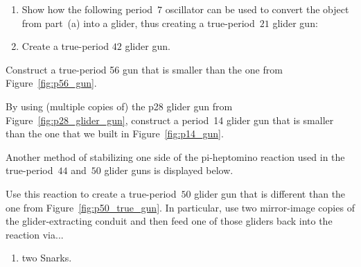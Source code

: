 \begin{multicols}{2}
\begin{problemstar}
\begin{enumerate}[label=\bf\color{ocre}(\alph*)]
			\item {} Show how the following period~$7$ oscillator can be used to convert the object from part~(a) into a glider, thus creating a true-period~$21$ glider gun:
			\begin{center}
			\end{center}
			
			\item {} Create a true-period $42$ glider gun.
		\end{enumerate}
	\end{problemstar}


	\mfilbreak
	
	
	\begin{problem}\label{exer:p56_gun_smaller} 
		Construct a true-period 56 gun that is smaller than the one from Figure~\ref{fig:p56_gun}.
		
	\end{problem}
	
	
	\mfilbreak
	
	
	\begin{problem}\label{exer:smaller_p14_gun} 
		By using (multiple copies of) the p28 glider gun from Figure~\ref{fig:p28_glider_gun}, construct a period~14 glider gun that is smaller than the one that we built in Figure~\ref{fig:p14_gun}.
	\end{problem}
	
	
	\mfilbreak
	
	
	\begin{problemstar}\label{exer:p50_glider_stabilize} 
		Another method of stabilizing one side of the pi-heptomino reaction used in the true-period~$44$ and~$50$ glider guns is displayed below.
		\begin{center}
		\end{center}
		\noindent Use this reaction to create a true-period~$50$ glider gun that is different than the one from Figure~\ref{fig:p50_true_gun}. In particular, use two mirror-image copies of the glider-extracting conduit and then feed one of those gliders back into the reaction via...\smallskip
		
		\begin{enumerate}[label=\bf\color{ocre}(\alph*)]
			\item two Snarks.
			

\end{enumerate}
\end{problemstar}
\end{multicols}
